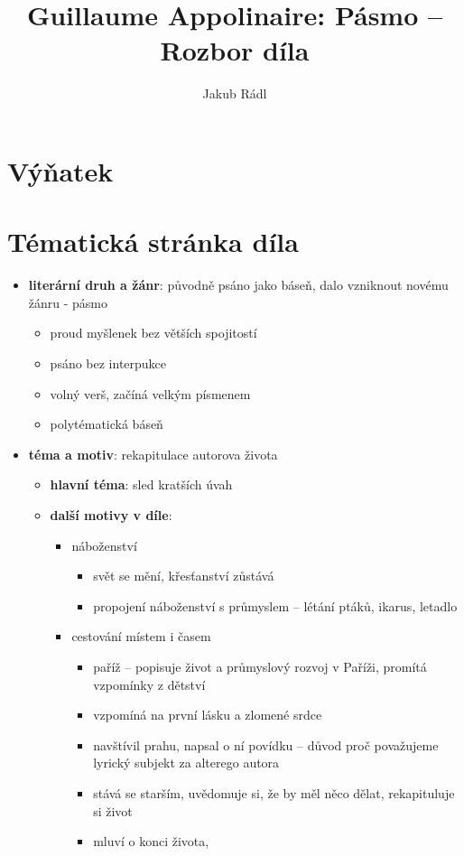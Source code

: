 \documentclass[10pt,a4paper]{article}
\date{}
\author{Jakub Rádl}
\title{Guillaume Appolinaire: Pásmo -- Rozbor díla}
\begin{document}
\maketitle

\section*{Výňatek}

\section*{Tématická stránka díla}
\begin{itemize}
\item \textbf{literární druh a žánr}: původně psáno jako báseň, dalo vzniknout novému žánru - pásmo
	\begin{itemize}
		\item proud myšlenek bez větších spojitostí
		\item psáno bez interpukce
		\item volný verš, začíná velkým písmenem
		\item polytématická báseň
	\end{itemize}
\item \textbf{téma a motiv}: rekapitulace autorova života
	\begin{itemize}
	\item \textbf{hlavní téma}: sled kratších úvah
	\item \textbf{další motivy v díle}:
		\begin{itemize}
		\item náboženství
			\begin{itemize}
			\item svět se mění, křesťanství zůstává
			\item propojení náboženství s průmyslem -- létání ptáků, ikarus, letadlo
			\end{itemize}
		\item cestování místem i časem
			\begin{itemize}
			\item paříž -- popisuje život a průmyslový rozvoj v Paříži, promítá vzpomínky z dětství
			\item vzpomíná na první lásku a zlomené srdce
			\item navštívil prahu, napsal o ní povídku -- důvod proč považujeme lyrický subjekt za alterego autora
			\item stává se starším, uvědomuje si, že by měl něco dělat, rekapituluje si život
			\item mluví o konci života, 


\end{itemize}
\end{itemize}
\end{itemize}
\end{itemize}
\end{document}
